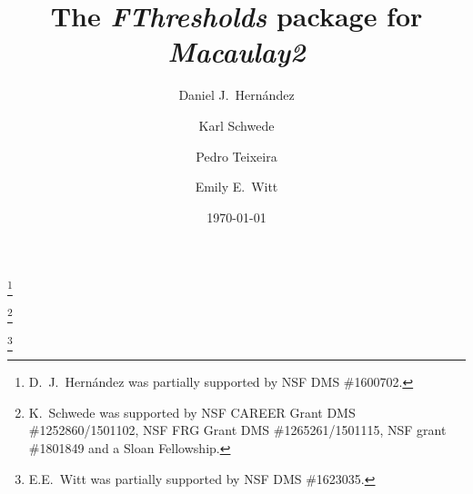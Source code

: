 \documentclass{amsart}
\begin{document}
\title{The  \emph{FThresholds} package for \emph{Macaulay2}}

\author[]{Daniel J.\ Hern\'andez}
\address{Department of Mathematics, University of Kansas, Lawrence, KS~66045, USA}
\thanks{D.~J.~Hern\'andez was partially supported by NSF DMS \#1600702.}





\author[]{Karl Schwede}
\address{Department of Mathematics, University of Utah, Salt Lake City, UT~84112, USA}
\thanks{K.~Schwede was supported by NSF CAREER Grant DMS \#1252860/1501102, NSF FRG Grant DMS \#1265261/1501115, NSF grant \#1801849 and a Sloan Fellowship.}


\author[]{Pedro Teixeira}
\address{Department of Mathematics, Knox College, Galesburg, IL~61401, USA}

\author[]{Emily E.\ Witt}
\address{Department of Mathematics, University of Kansas, Lawrence, KS~66045, USA}
\thanks{E.E.~Witt was partially supported by NSF DMS \#1623035.}
\date{\today}
\end{document}

